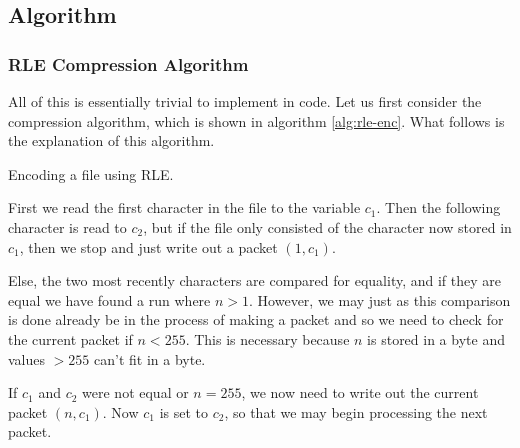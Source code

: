 \subsection{Algorithm}

\subsubsection{RLE Compression Algorithm}

All of this is essentially trivial to implement in code. Let us first
consider the compression algorithm, which is shown in algorithm
\ref{alg:rle-enc}. What follows is the explanation of this algorithm.

\begin{algorithm}
  \caption{Encoding a file using RLE.}
  \label{alg:rle-enc}
  \begin{algorithmic}[1]


    \While{\True}


    \If{\eof}
    \Break
    \EndIf

    \Else
    \State {}
    \State {}

    \EndIf

    \EndWhile

    \State {}
    \State {}
  \end{algorithmic}
\end{algorithm}

First we read the first character in the file to the variable
$c_1$. Then the following character is read to $c_2$, but if the file
only consisted of the character now stored in $c_1$, then we stop and
just write out a packet $(1,c_1)$.

Else, the two most recently characters are compared for equality, and
if they are equal we have found a run where $n > 1$. However, we may
just as this comparison is done already be in the process of making a
packet and so we need to check for the current packet if $n <
255$. This is necessary because $n$ is stored in a byte and values $>
255$ can't fit in a byte.

If $c_1$ and $c_2$ were not equal or $n = 255$, we now need to write
out the current packet $(n,c_1)$. Now $c_1$ is set to $c_2$, so that
we may begin processing the next packet.

